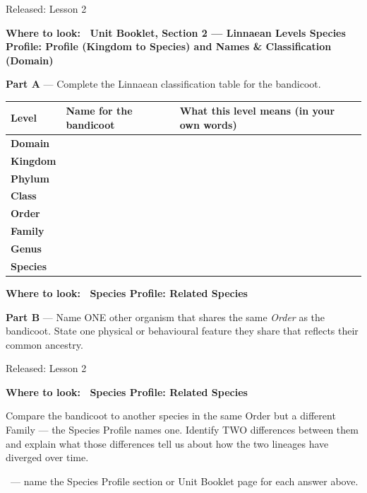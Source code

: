 \documentclass[11pt,a4paper]{article}
\newcommand{\wheretolook}[1]{%
  \par\vspace{2pt}\noindent
  \colorbox{GoldLight}{\parbox{\dimexpr\linewidth-2\fboxsep\relax}{%
    \small\color{GoldDark}\headingfont\bfseries Where to look:\ %
    \normalfont\color{DarkGrey}#1}}\par\vspace{4pt}}
\newcommand{\answerbox}[1]{%
  \begin{tcolorbox}[
    enhanced, breakable, arc=2mm,
    colback=Paper, colframe=Line,
    left=2mm, right=2mm, top=1mm, bottom=1mm,
    boxrule=1pt, height=#1
  ]
  \end{tcolorbox}%
}
\newcommand{\yr}[2]{\noindent{\headingfont\bfseries\small\color{Forest}%
  \rule[0.2ex]{1.2em}{2pt}\hspace{4pt}#1}\hfill{\small\color{DarkGrey}#2}\\[2pt]}
\newcommand{\yrviii}[2]{\noindent{\headingfont\bfseries\small\color{Violet}%
  \rule[0.2ex]{1.2em}{2pt}\hspace{4pt}#1}\hfill{\small\color{DarkGrey}#2}\\[2pt]}
\begin{document}
\bigskip

\begin{yr7box}
\yr{At The Level}{Released: Lesson 2}

\wheretolook{Unit Booklet, Section 2 --- Linnaean Levels \textbullet{} \textbf{Species Profile: Profile} (Kingdom to Species) and \textbf{Names \& Classification} (Domain)}
\textbf{Part A} --- Complete the Linnaean classification table for the bandicoot.

\medskip
\noindent\begin{tabularx}{\linewidth}{|>{\bfseries}p{2cm}|p{3cm}|X|}
  \hline
  \rowcolor{TableHead}
  \headingfont\bfseries\color{white} Level &
  \headingfont\bfseries\color{white} Name for the bandicoot &
  \headingfont\bfseries\color{white} What this level means (in your own words) \\
  \hline
  Domain & & \\[30pt]
  \hline
  \rowcolor{RowAlt}
  Kingdom & & \\[30pt]
  \hline
  Phylum & & \\[30pt]
  \hline
  \rowcolor{RowAlt}
  Class & & \\[30pt]
  \hline
  Order & & \\[30pt]
  \hline
  \rowcolor{RowAlt}
  Family & & \\[30pt]
  \hline
  Genus & & \\[30pt]
  \hline
  \rowcolor{RowAlt}
  Species & & \\[30pt]
  \hline
\end{tabularx}
\newpage
\bigskip
\wheretolook{\textbf{Species Profile: Related Species}}
\textbf{Part B} --- Name ONE other organism that shares the same \emph{Order} as the bandicoot. State one physical or behavioural feature they share that reflects their common ancestry.
\answerbox{5cm}
\end{yr7box}

\bigskip

\begin{yr8box}
\yrviii{Above The Level}{Released: Lesson 2}
\wheretolook{\textbf{Species Profile: Related Species}}
Compare the bandicoot to another species in the same Order but a different Family --- the Species Profile names one. Identify TWO differences between them and explain what those differences tell us about how the two lineages have diverged over time.
\answerbox{10cm}
\end{yr8box}

\bigskip{}
{\small\color{DarkGrey}\ --- name the Species Profile section or Unit Booklet page for each answer above.}
\answerbox{1.5cm}
\end{document}
